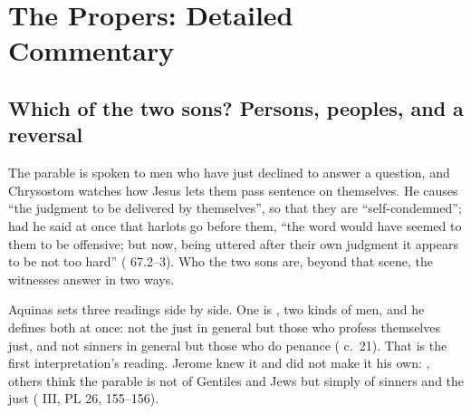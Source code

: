 
\section{The Propers: Detailed Commentary}

\subsection{Which of the two sons? Persons, peoples, and a reversal}

The parable is spoken to men who have just declined to answer a question, and
Chrysostom watches how Jesus lets them pass sentence on themselves. He causes
``the judgment to be delivered by themselves'', so that they are
``self-condemned''; had he said at once that harlots go before them, ``the
word would have seemed to them to be offensive; but now, being uttered after
their own judgment it appears to be not too hard'' (
67.2--3). Who the two sons are, beyond that scene, the witnesses answer in two
ways.

Aquinas sets three readings side by side. One is , two kinds of men, and he defines both at once: not the
just in general but those who profess themselves just, and not sinners in
general but those who do penance ( c.~21). That is the
first interpretation's reading. Jerome knew it and did not make it his own:
, others think the parable is not of
Gentiles and Jews but simply of sinners and the just ( III, PL 26, 155--156).

